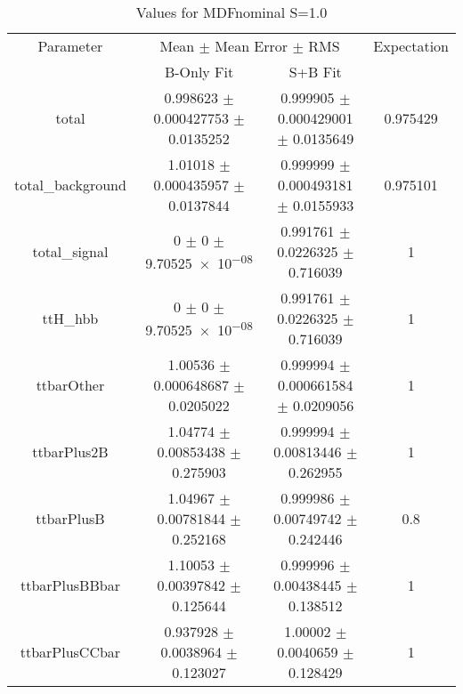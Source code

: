 \begin{table}
\centering
\caption{Values for MDFnominal S=1.0}
\begin{tabular}{cccc}
\toprule
Parameter & \multicolumn{2}{c}{Mean $\pm$ Mean Error $\pm$ RMS} & Expectation\\
 & B-Only Fit & S+B Fit & \\
\midrule
total & \num{0.998623} $\pm$ \num{0.000427753} $\pm$ \num{0.0135252} & \num{0.999905} $\pm$ \num{0.000429001} $\pm$ \num{0.0135649} & \num{0.975429}\\
total\_background & \num{1.01018} $\pm$ \num{0.000435957} $\pm$ \num{0.0137844} & \num{0.999999} $\pm$ \num{0.000493181} $\pm$ \num{0.0155933} & \num{0.975101}\\
total\_signal & \num{0} $\pm$ \num{0} $\pm$ \num{9.70525e-08} & \num{0.991761} $\pm$ \num{0.0226325} $\pm$ \num{0.716039} & \num{1}\\
ttH\_hbb & \num{0} $\pm$ \num{0} $\pm$ \num{9.70525e-08} & \num{0.991761} $\pm$ \num{0.0226325} $\pm$ \num{0.716039} & \num{1}\\
ttbarOther & \num{1.00536} $\pm$ \num{0.000648687} $\pm$ \num{0.0205022} & \num{0.999994} $\pm$ \num{0.000661584} $\pm$ \num{0.0209056} & \num{1}\\
ttbarPlus2B & \num{1.04774} $\pm$ \num{0.00853438} $\pm$ \num{0.275903} & \num{0.999994} $\pm$ \num{0.00813446} $\pm$ \num{0.262955} & \num{1}\\
ttbarPlusB & \num{1.04967} $\pm$ \num{0.00781844} $\pm$ \num{0.252168} & \num{0.999986} $\pm$ \num{0.00749742} $\pm$ \num{0.242446} & \num{0.8}\\
ttbarPlusBBbar & \num{1.10053} $\pm$ \num{0.00397842} $\pm$ \num{0.125644} & \num{0.999996} $\pm$ \num{0.00438445} $\pm$ \num{0.138512} & \num{1}\\
ttbarPlusCCbar & \num{0.937928} $\pm$ \num{0.0038964} $\pm$ \num{0.123027} & \num{1.00002} $\pm$ \num{0.0040659} $\pm$ \num{0.128429} & \num{1}\\
\bottomrule
\end{tabular}
\end{table}